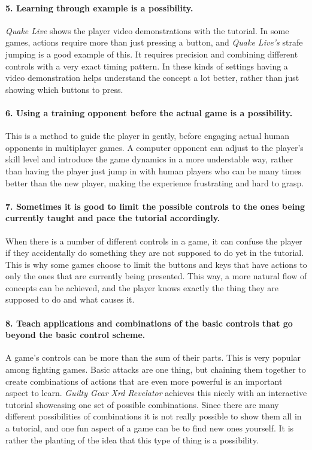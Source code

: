 \paragraph{5. Learning through example is a possibility.}
\textit{Quake Live} shows the player video demonstrations with the tutorial. In some games, actions require more than just pressing a button, and \textit{Quake Live's} strafe jumping is a good example of this. It requires precision and combining different controls with a very exact timing pattern. In these kinds of settings having a video demonstration helps understand the concept a lot better, rather than just showing which buttons to press.
\paragraph{6. Using a training opponent before the actual game is a possibility.}
This is a method to guide the player in gently, before engaging actual human opponents in multiplayer games. A computer opponent can adjust to the player's skill level and introduce the game dynamics in a more understable way, rather than having the player just jump in with human players who can be many times better than the new player, making the experience frustrating and hard to grasp.
\paragraph{7. Sometimes it is good to limit the possible controls to the ones being currently taught and pace the tutorial accordingly.}
When there is a number of different controls in a game, it can confuse the player if they accidentally do something they are not supposed to do yet in the tutorial. This is why some games choose to limit the buttons and keys that have actions to only the ones that are currently being presented. This way, a more natural flow of concepts can be achieved, and the player knows exactly the thing they are supposed to do and what causes it.
\paragraph{8. Teach applications and combinations of the basic controls that go beyond the basic control scheme.}
A game's controls can be more than the sum of their parts. This is very popular among fighting games. Basic attacks are one thing, but chaining them together to create combinations of actions that are even more powerful is an important aspect to learn. \textit{Guilty Gear Xrd Revelator} achieves this nicely with an interactive tutorial showcasing one set of possible combinations. Since there are many different possibilities of combinations it is not really possible to show them all in a tutorial, and one fun aspect of a game can be to find new ones yourself. It is rather the planting of the idea that this type of thing is a possibility.
